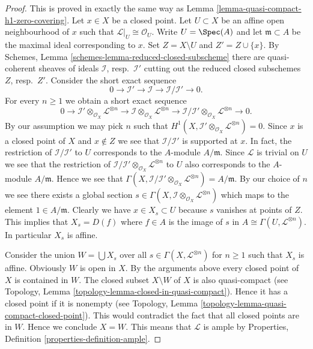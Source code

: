 \begin{proof}
This is proved in exactly the same way as
Lemma \ref{lemma-quasi-compact-h1-zero-covering}.
Let $x \in X$ be a closed point. Let $U \subset X$ be an affine open
neighbourhood of $x$ such that $\mathcal{L}|_U \cong \mathcal{O}_U$.
Write $U = \Spec(A)$ and let
$\mathfrak m \subset A$ be the maximal ideal corresponding to $x$.
Set $Z = X \setminus U$ and $Z' = Z \cup \{x\}$.
By Schemes, Lemma \ref{schemes-lemma-reduced-closed-subscheme} there
are quasi-coherent sheaves of ideals
$\mathcal{I}$, resp.\ $\mathcal{I}'$ cutting out
the reduced closed subschemes $Z$, resp.\ $Z'$.
Consider the short exact sequence
$$
0 \to \mathcal{I}' \to \mathcal{I} \to \mathcal{I}/\mathcal{I}' \to 0.
$$
For every $n \geq 1$ we obtain a short exact sequence
$$
0 \to \mathcal{I}' \otimes_{\mathcal{O}_X} \mathcal{L}^{\otimes n}
\to \mathcal{I} \otimes_{\mathcal{O}_X} \mathcal{L}^{\otimes n} \to
\mathcal{I}/\mathcal{I}' \otimes_{\mathcal{O}_X} \mathcal{L}^{\otimes n} \to 0.
$$
By our assumption we may pick $n$ such that
$H^1(X, \mathcal{I}' \otimes_{\mathcal{O}_X} \mathcal{L}^{\otimes n}) = 0$.
Since $x$ is a closed point of $X$ and $x \not \in Z$ we see that
$\mathcal{I}/\mathcal{I}'$ is supported at $x$. In fact, the restriction
of $\mathcal{I}/\mathcal{I'}$ to $U$ corresponds to the $A$-module
$A/\mathfrak m$. Since $\mathcal{L}$ is trivial on $U$
we see that the restriction of
$\mathcal{I}/\mathcal{I}' \otimes_{\mathcal{O}_X} \mathcal{L}^{\otimes n}$
to $U$ also corresponds to the $A$-module $A/\mathfrak m$.
Hence we see that
$\Gamma(X, \mathcal{I}/\mathcal{I'} \otimes_{\mathcal{O}_X}
\mathcal{L}^{\otimes n}) = A/\mathfrak m$.
By our choice of $n$ we see there exists a global section
$s \in \Gamma(X, \mathcal{I} \otimes_{\mathcal{O}_X} \mathcal{L}^{\otimes n})$
which maps to the element $1 \in A/\mathfrak m$. Clearly we have
$x \in X_s \subset U$ because $s$ vanishes at points of $Z$.
This implies that $X_s = D(f)$ where
$f \in A$ is the image of $s$ in $A \cong \Gamma(U, \mathcal{L}^{\otimes n})$.
In particular $X_s$ is affine.

\medskip\noindent
Consider the union $W = \bigcup X_s$ over all
$s \in \Gamma(X, \mathcal{L}^{\otimes n})$ for $n \geq 1$
such that $X_s$ is affine. Obviously $W$ is open in $X$.
By the arguments above every closed point of
$X$ is contained in $W$. The closed subset $X \setminus W$ of $X$
is also quasi-compact
(see Topology, Lemma \ref{topology-lemma-closed-in-quasi-compact}).
Hence it has a closed point if it is nonempty (see
Topology, Lemma \ref{topology-lemma-quasi-compact-closed-point}).
This would contradict the fact that all closed points are in
$W$. Hence we conclude $X = W$. This means that $\mathcal{L}$
is ample by Properties, Definition \ref{properties-definition-ample}.
\end{proof}


